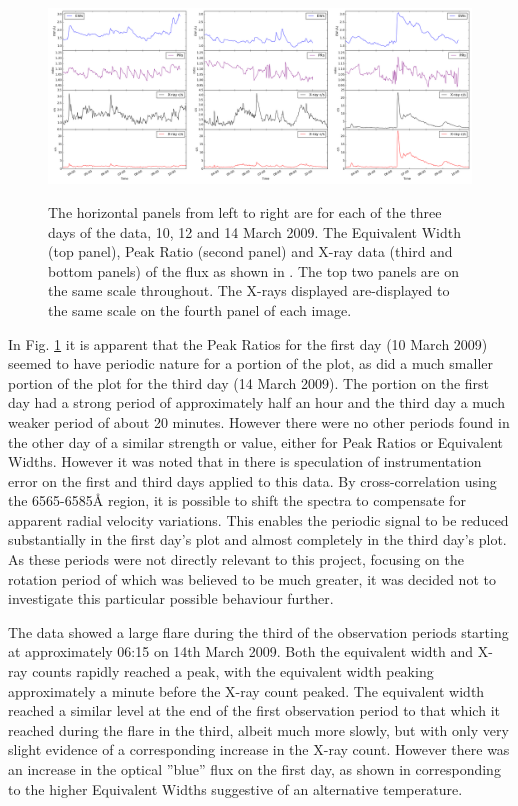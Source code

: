 \begin{figure}[!htbp]
\begin{center}
\includegraphics[scale=0.18]{Figures/uvrx-onepic.png} \\
\end{center}   
\caption{The horizontal panels from left to right are for each of the three days of the {\uves} data, 10, 12 and 14
  March 2009.  The Equivalent Width (top panel), Peak Ratio (second panel) and X-ray data (third and bottom panels) of the
  {\ha} flux as shown in \citet[Fig. 1 to Fig.3]{fuhrmeister11}. The top two panels are on the same scale
  throughout. The X-rays displayed are-displayed to the same scale on the fourth panel of each image.}
 \protect\label{fig:uvrxp1}
\end{figure}

In Fig. \ref{fig:uvrxp1} it is apparent that the Peak Ratios for the first day (10 March 2009) seemed to have periodic
nature for a portion of the plot, as did a much smaller portion of the plot for the third day (14 March 2009). The
portion on the first day had a strong period of approximately half an hour and the third day a much weaker period of
about 20 minutes.  However there were no other periods found in the other day of a similar strength or value, either for
Peak Ratios or Equivalent Widths. However it was noted that in \citet[Section 4.1]{barnes14} there is speculation of
instrumentation error on the first and third days applied to this data. By cross-correlation using the 6565-6585{\AA}
region, it is possible to shift the spectra to compensate for apparent radial velocity variations. This enables the
periodic signal to be reduced substantially in the first day's plot and almost completely in the third day's plot. As
these periods were not directly relevant to this project, focusing on the rotation period of {\prox} which was believed
to be much greater, it was decided not to investigate this particular possible behaviour further.

The {\uves} data showed a large flare during the third of the observation periods starting at approximately 06:15 on
14th March 2009. Both the equivalent width and X-ray counts rapidly reached a peak, with the equivalent width peaking
approximately a minute before the X-ray count peaked. The equivalent width reached a similar level at the end of the
first observation period to that which it reached during the flare in the third, albeit much more slowly, but with only
very slight evidence of a corresponding increase in the X-ray count. However there was an increase in the {\uves}
optical ''blue'' flux on the first day, as shown in \citet[fig. 1]{fuhrmeister11} corresponding to the higher Equivalent
Widths suggestive of an alternative temperature.

